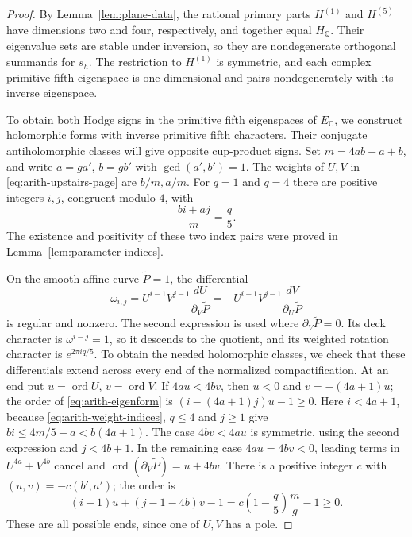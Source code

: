 \begin{proof}
By Lemma~\ref{lem:plane-data}, the rational primary parts
$H^{(1)}$ and $H^{(5)}$ have dimensions two and four, respectively,
and together equal
$H_{\mathbb Q}$. Their eigenvalue sets are stable under inversion, so
they are nondegenerate orthogonal summands for $s_h$. The restriction
to $H^{(1)}$ is symmetric, and each complex primitive fifth
eigenspace is one-dimensional and pairs nondegenerately with its
inverse eigenspace.

To obtain both Hodge signs in the primitive fifth eigenspaces of
$E_{\mathbb C}$, we construct holomorphic forms with inverse primitive
fifth characters. Their conjugate antiholomorphic classes will give
opposite cup-product signs. Set $m=4ab+a+b$, and write
$a=ga'$, $b=gb'$ with $\gcd(a',b')=1$.  The weights of $U,V$ in
\eqref{eq:arith-upstairs-page} are $b/m,a/m$.  For $q=1$ and $q=4$
there are positive integers $i,j$, congruent modulo $4$, with
\begin{equation}\label{eq:arith-weight-indices}
 \frac{bi+aj}{m}=\frac q5.
\end{equation}
The existence and positivity of these two index pairs were proved in
Lemma~\ref{lem:parameter-indices}.

On the smooth affine curve $\widetilde P=1$, the differential
\begin{equation}\label{eq:arith-eigenform}
 \omega_{i,j}=U^{i-1}V^{j-1}
        \frac{dU}{\partial_V\widetilde P}
       =-U^{i-1}V^{j-1}
        \frac{dV}{\partial_U\widetilde P}
\end{equation}
is regular and nonzero.  The second expression is used where
$\partial_V\widetilde P=0$.  Its deck character is
$\omega^{i-j}=1$, so it descends to the quotient, and its weighted
rotation character is $e^{2\pi iq/5}$.
To obtain the needed holomorphic classes, we check that these
differentials extend across every end of the normalized
compactification. At an end put
$u=\operatorname{ord}U$, $v=\operatorname{ord}V$.
If $4au<4bv$, then $u<0$ and $v=-(4a+1)u$; the order of
\eqref{eq:arith-eigenform} is
$(i-(4a+1)j)u-1\ge0$.  Here
$i<4a+1$, because \eqref{eq:arith-weight-indices}, $q\le4$ and
$j\ge1$ give $bi\le4m/5-a<b(4a+1)$.
The case $4bv<4au$ is symmetric, using the second expression and
$j<4b+1$.  In the remaining case $4au=4bv<0$, leading terms in
$U^{4a}+V^{4b}$ cancel and
$\operatorname{ord}(\partial_V\widetilde P)=u+4bv$.
There is a positive integer $c$ with $(u,v)=-c(b',a')$; the order is
\[
 (i-1)u+(j-1-4b)v-1
 =c\left(1-\frac q5\right)\frac mg-1\ge0.
\]
These are all possible ends, since one of $U,V$ has a pole.


\end{proof}

